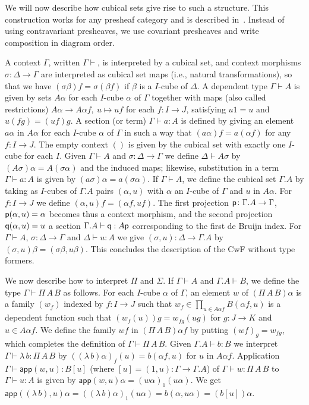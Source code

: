 \documentclass[10pt,a4paper]{article}
\newcommand{\app}{\mathsf{app}}
\newcommand{\pp}{{\sf p}}
\newcommand{\qq}{{\sf q}}
\begin{document}
We will now describe how cubical sets give rise to such a structure.
This construction works for any presheaf category and is described
in~\cite[Sec.~4]{Hofmann}.  Instead of using contravariant presheaves,
we use covariant presheaves and write composition in diagram order.

A context $\Gamma$, written $\Gamma \vdash$, is interpreted by a
cubical set, and context morphisms $\sigma:\Delta\to\Gamma$ are
interpreted as cubical set maps (i.e., natural transformations), so
that we have $(\sigma\beta)f = \sigma(\beta f)$ if $\beta$ is a
$I$-cube of $\Delta$.  A dependent type $\Gamma\vdash A$ is given by
sets $A\alpha$ for each $I$-cube $\alpha$ of $\Gamma$ together with
maps (also called restrictions) $A\alpha\to A\alpha f,~u\longmapsto
uf$ for each $f \colon I \to J$, satisfying $u1 = u$ and $u(fg) =
(uf)g$.  A section (or term) $\Gamma\vdash a:A$ is defined by giving
an element $a\alpha$ in $A\alpha$ for each $I$-cube $\alpha$ of
$\Gamma$ in such a way that $(a\alpha) f = a (\alpha f)$ for any $f
\colon I \to J$.  The empty context $()$ is given by the cubical set
with exactly one $I$-cube for each $I$.  Given $\Gamma \vdash A$ and
$\sigma \colon \Delta \to \Gamma$ we define $\Delta \vdash A \sigma$
by $(A \sigma) \alpha = A (\sigma \alpha)$ and the induced maps;
likewise, substitution in a term $\Gamma \vdash a : A$ is given by $(a
\sigma) \alpha = a (\sigma \alpha)$.  If $\Gamma\vdash A$, we define
the cubical set $\Gamma.A$ by taking as $I$-cubes of $\Gamma.A$ pairs
$(\alpha,u)$ with $\alpha$ an $I$-cube of $\Gamma$ and $u$ in
$A\alpha$. For $f:I\to J$ we define $(\alpha,u)f = (\alpha f,u f)$.
The first projection $\pp \colon \Gamma.A \to \Gamma$, $\pp (\alpha,
u) = \alpha$ becomes thus a context morphism, and the second
projection $\qq (\alpha, u) = u$ a section $\Gamma.A \vdash \qq : A
\pp$ corresponding to the first de Bruijn index.  For $\Gamma \vdash
A$, $\sigma \colon \Delta \to \Gamma$ and $\Delta \vdash u : A$ we
give $(\sigma, u) \colon \Delta \to \Gamma.A$ by $(\sigma, u) \beta =
(\sigma \beta, u \beta)$.  This concludes the description of the CwF
without type formers.

We now describe how to interpret $\Pi$ and $\Sigma$. If $\Gamma\vdash
A$ and $\Gamma.A\vdash B$, we define the type $\Gamma\vdash \Pi\,A\,B$
as follows.  For each $I$-cube $\alpha$ of $\Gamma$, an element $w$ of
$(\Pi\,A\,B)\alpha$ is a family $(w_f)$ indexed by $f:I\to J$ such
that $w_f \in \prod_{u \in A \alpha f} B (\alpha f, u)$ is a dependent
function such that $(w_f (u)) g = w_{fg} (u g)$ for $g \colon J \to K$
and $u \in A \alpha f$.  We define the family $wf$ in $(\Pi\,A\,B)
\alpha f$ by putting $(wf)_g = w_{fg}$, which completes the definition
of $\Gamma\vdash \Pi\,A\,B$.  Given $\Gamma.A \vdash b : B$ we
interpret $\Gamma \vdash \lambda\,b : \Pi\,A\,B$ by $ ((\lambda\, b)
\alpha)_f (u) = b (\alpha f, u)$ for $u$ in $A \alpha f$.  Application
$\Gamma \vdash \app (w,u) : B [u]$ (where $[u] = (1, u) \colon \Gamma
\to \Gamma.A$) of $\Gamma \vdash w : \Pi\,A\,B$ to $\Gamma \vdash u :
A$ is given by $\app (w, u) \alpha = (w\alpha)_1 (u\alpha)$.  We get
$\app ((\lambda\,b), u) \alpha = ((\lambda\,b) \alpha)_1 (u \alpha) =
b (\alpha, u\alpha) = (b [u]) \alpha$.
\end{document}
